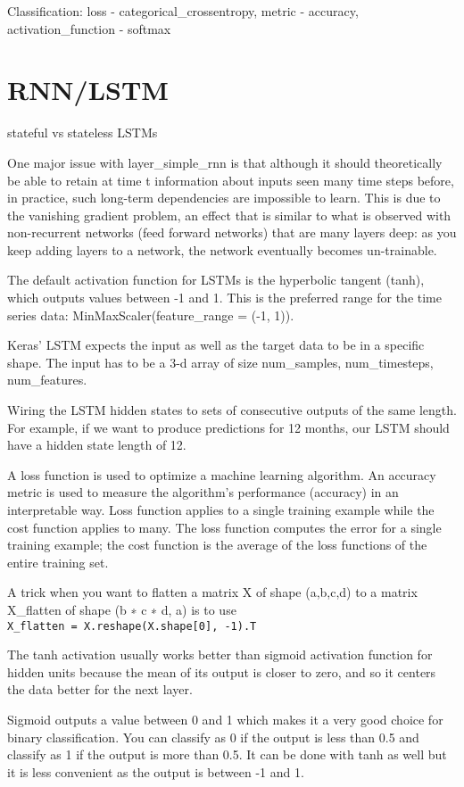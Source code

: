 \documentclass[]{book}
\begin{document}
Classification: loss - categorical\_crossentropy, metric - accuracy,
activation\_function - softmax

\section{RNN/LSTM}\label{rnnlstm}

stateful vs stateless LSTMs

One major issue with layer\_simple\_rnn is that although it should
theoretically be able to retain at time t information about inputs seen
many time steps before, in practice, such long-term dependencies are
impossible to learn. This is due to the vanishing gradient problem, an
effect that is similar to what is observed with non-recurrent networks
(feed forward networks) that are many layers deep: as you keep adding
layers to a network, the network eventually becomes un-trainable.

The default activation function for LSTMs is the hyperbolic tangent
(tanh), which outputs values between -1 and 1. This is the preferred
range for the time series data: MinMaxScaler(feature\_range = (-1, 1)).

Keras' LSTM expects the input as well as the target data to be in a
specific shape. The input has to be a 3-d array of size num\_samples,
num\_timesteps, num\_features.

Wiring the LSTM hidden states to sets of consecutive outputs of the same
length. For example, if we want to produce predictions for 12 months,
our LSTM should have a hidden state length of 12.

A loss function is used to optimize a machine learning algorithm. An
accuracy metric is used to measure the algorithm's performance
(accuracy) in an interpretable way. Loss function applies to a single
training example while the cost function applies to many. The loss
function computes the error for a single training example; the cost
function is the average of the loss functions of the entire training
set.

A trick when you want to flatten a matrix X of shape (a,b,c,d) to a
matrix X\_flatten of shape (b ∗ c ∗ d, a) is to use
\texttt{X\_flatten\ =\ X.reshape(X.shape{[}0{]},\ -1).T}

The tanh activation usually works better than sigmoid activation
function for hidden units because the mean of its output is closer to
zero, and so it centers the data better for the next layer.

Sigmoid outputs a value between 0 and 1 which makes it a very good
choice for binary classification. You can classify as 0 if the output is
less than 0.5 and classify as 1 if the output is more than 0.5. It can
be done with tanh as well but it is less convenient as the output is
between -1 and 1.
\end{document}
